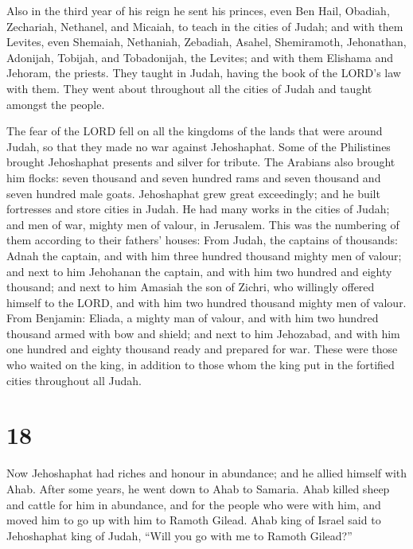  Also in the third year of his reign he sent his princes,
even Ben Hail, Obadiah, Zechariah, Nethanel, and Micaiah, to teach in
the cities of Judah;  and with them Levites, even Shemaiah,
Nethaniah, Zebadiah, Asahel, Shemiramoth, Jehonathan, Adonijah, Tobijah,
and Tobadonijah, the Levites; and with them Elishama and Jehoram, the
priests.  They taught in Judah, having the book of the
LORD's law with them. They went about throughout all the cities of Judah
and taught amongst the people.

 The fear of the LORD fell on all the kingdoms of the lands
that were around Judah, so that they made no war against Jehoshaphat.
 Some of the Philistines brought Jehoshaphat presents and
silver for tribute. The Arabians also brought him flocks: seven thousand
and seven hundred rams and seven thousand and seven hundred male goats.
 Jehoshaphat grew great exceedingly; and he built
fortresses and store cities in Judah.  He had many works in
the cities of Judah; and men of war, mighty men of valour, in Jerusalem.
 This was the numbering of them according to their fathers'
houses: From Judah, the captains of thousands: Adnah the captain, and
with him three hundred thousand mighty men of valour;  and
next to him Jehohanan the captain, and with him two hundred and eighty
thousand;  and next to him Amasiah the son of Zichri, who
willingly offered himself to the LORD, and with him two hundred thousand
mighty men of valour.  From Benjamin: Eliada, a mighty man
of valour, and with him two hundred thousand armed with bow and shield;
 and next to him Jehozabad, and with him one hundred and
eighty thousand ready and prepared for war.  These were
those who waited on the king, in addition to those whom the king put in
the fortified cities throughout all Judah.

\hypertarget{section-17}{%
\section{18}\label{section-17}}

 Now Jehoshaphat had riches and honour in abundance; and he
allied himself with Ahab.  After some years, he went down to
Ahab to Samaria. Ahab killed sheep and cattle for him in abundance, and
for the people who were with him, and moved him to go up with him to
Ramoth Gilead.  Ahab king of Israel said to Jehoshaphat king
of Judah, ``Will you go with me to Ramoth Gilead?''

